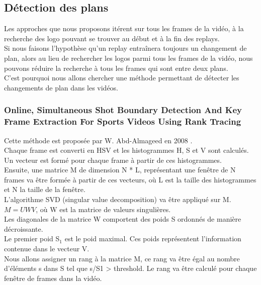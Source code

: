 \documentclass[11pt]{article}
\begin{document}
\subsection{Détection des plans}
\label{sec:org2d62eb7}
Les approches que nous proposons itérent sur tous les frames de la vidéo, à la recherche des logo pouvant se trouver au début et à la fin des replays.\\
Si nous faisons l'hypothèse qu'un replay entraînera toujours un changement de plan, alors au lieu de rechercher les logos parmi tous les frames de la vidéo, nous pouvons réduire la recherche à tous les frames qui sont entre deux plans.\\

C'est pourquoi nous allons chercher une méthode permettant de détecter les changements de plan dans les vidéos.\\

\subsubsection{Online, Simultaneous Shot Boundary Detection And Key Frame Extraction For Sports Videos Using Rank Tracing}
\label{sec:org8c550e5}
Cette méthode est proposée par W. Abd-Almageed en 2008 \cite{Abd_Almageed_2008}.\\

Chaque frame est converti en HSV et les histogrammes H, S et V sont calculés.\\
Un vecteur est formé pour chaque frame à partir de ces histogrammes.\\
Ensuite, une matrice M de dimension N * L, représentant une fenêtre de N frames va être formée à partir de ces vecteurs, où L est la taille des histogrammes et N la taille de la fenêtre.\\

L'algorithme SVD (singular value decomposition) va être appliqué sur M.  \(M = UWV\), où W est la matrice de valeurs singulières.\\

Les diagonales de la matrice W comportent des poids S ordonnés de manière décroissante.\\
Le premier poid S\(_{\text{1}}\) est le poid maximal. Ces poids représentent l'information contenue dans le vecteur V.\\

Nous allons assigner un rang à la matrice M,  ce rang va être égal au nombre d'éléments s dans S tel que s/S1 > threshold. Le rang va être calculé pour chaque fenêtre de frames dans la vidéo.\\
\end{document}
